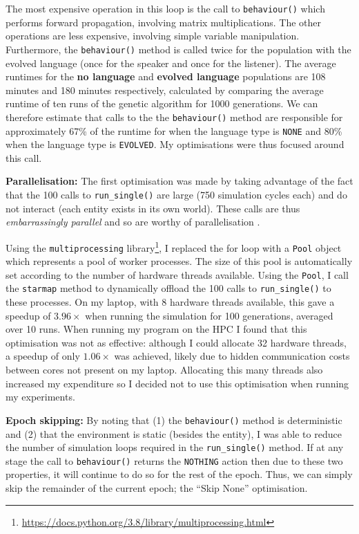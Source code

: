 \documentclass[12pt,a4paper]{report}
\begin{document}
The most expensive operation in this loop is the call to \texttt{behaviour()} which performs forward propagation, involving matrix multiplications. The other operations are less expensive, involving simple variable manipulation. Furthermore, the \texttt{behaviour()} method is called twice for the population with the evolved language (once for the speaker and once for the listener). The average runtimes for the {\bf no language} and {\bf evolved language} populations are 108 minutes and 180 minutes respectively, calculated by comparing the average runtime of ten runs of the genetic algorithm for 1000 generations. We can therefore estimate that calls to the the \texttt{behaviour()} method are responsible for approximately 67\% of the runtime for when the language type is \texttt{NONE} and 80\% when the language type is \texttt{EVOLVED}. My optimisations were thus focused around this call.

{\bf Parallelisation:} The first optimisation was made by taking advantage of the fact that the 100 calls to \texttt{run\_single()} are large (750 simulation cycles each) and do not interact (each entity exists in its own world). These calls are thus \emph{embarrassingly parallel} and so are worthy of parallelisation \citep{mycroft2019}.

Using the \texttt{multiprocessing} library\footnote{\url{https://docs.python.org/3.8/library/multiprocessing.html}}, I replaced the for loop with a \texttt{Pool} object which represents a pool of worker processes. The size of this pool is automatically set according to the number of hardware threads available. Using the \texttt{Pool}, I call the \texttt{starmap} method to dynamically offload the 100 calls to \texttt{run\_single()} to these processes. On my laptop, with 8 hardware threads available, this gave a speedup of $3.96\times$ when running the simulation for 100 generations, averaged over 10 runs. When running my program on the HPC I found that this optimisation was not as effective: although I could allocate 32 hardware threads, a speedup of only $1.06\times$ was achieved, likely due to hidden communication costs between cores not present on my laptop. Allocating this many threads also increased my expenditure so I decided not to use this optimisation when running my experiments.

{\bf Epoch skipping:} By noting that (1) the \texttt{behaviour()} method is deterministic and (2) that the environment is static (besides the entity), I was able to reduce the number of simulation loops required in the \texttt{run\_single()} method. If at any stage the call to \texttt{behaviour()} returns the \texttt{NOTHING} action then due to these two properties, it will continue to do so for the rest of the epoch. Thus, we can simply skip the remainder of the current epoch; the ``Skip None'' optimisation. 
\end{document}
